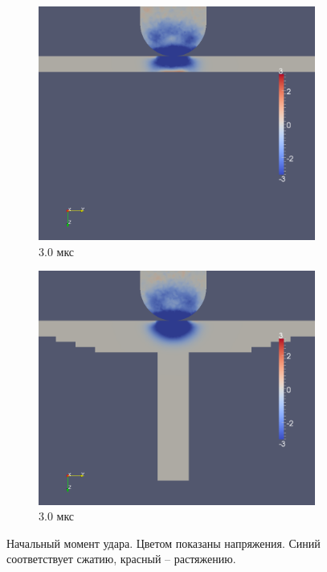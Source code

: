 \begin{figure}[htp]
\begin{subfigure}[b]{0.5\textwidth}
\centering
\includegraphics[width=\textwidth]{png/pkm-experiment/wing-only/wave/syy-0003.png}
\caption{3.0 мкс}
\end{subfigure}
\begin{subfigure}[b]{0.5\textwidth}
\centering
\includegraphics[width=\textwidth]{png/pkm-experiment/wing-stringer/wave/syy-0003.png}
\caption{3.0 мкс}
\end{subfigure}
\caption{Начальный момент удара. Цветом показаны напряжения. Синий соответствует сжатию, красный -- растяжению.}
\label{pic:pkm_experiment_stress_begin}
\end{figure}

